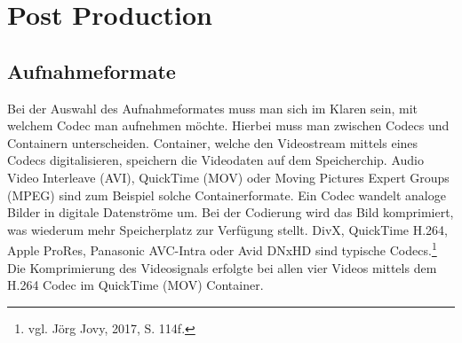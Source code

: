 \section{Post Production}
\subsection{Aufnahmeformate}
Bei der Auswahl des Aufnahmeformates muss man sich im Klaren sein, mit welchem Codec man aufnehmen möchte. Hierbei muss man zwischen Codecs und Containern unterscheiden. Container, welche den Videostream mittels eines Codecs digitalisieren, speichern die Videodaten auf dem Speicherchip. Audio Video Interleave (AVI), QuickTime (MOV) oder Moving Pictures Expert Groups (MPEG) sind zum Beispiel solche Containerformate. Ein Codec wandelt analoge Bilder in digitale Datenströme um. Bei der Codierung wird das Bild komprimiert, was wiederum mehr Speicherplatz zur Verfügung stellt. DivX, QuickTime H.264, Apple ProRes, Panasonic AVC-Intra oder Avid DNxHD sind typische Codecs.\footnote{vgl. Jörg Jovy, 2017, S. 114f.}\newline
Die Komprimierung des Videosignals erfolgte bei allen vier Videos mittels dem H.264 Codec im QuickTime (MOV) Container. 
